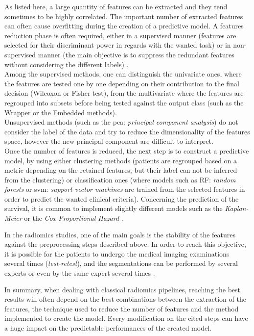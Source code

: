 As listed here, a large quantity of features can be extracted and they
tend sometimes to be highly correlated. The important number of extracted features can often cause
overfitting during the creation of a predictive model. A features reduction
phase is often required, either in a
supervised manner (features are selected for their discriminant power in
regards with the wanted task) or in non-supervised manner (the main
objective is to suppress the redundant features without considering the
different labels) \cite{Parekh2016}.\\
Among the supervised methods, one can distinguish the univariate ones,
where the features are tested one by one depending on their contribution
to the final decision (Wilcoxon or Fisher test), from the multivariate
where the features are regrouped into subsets before being tested
against the output class (such as the Wrapper or the Embedded methods).\\
Unsupervised methods (such as the \ac{pca}: \emph{principal component
analysis}) do not consider the label of the data and try 
to reduce the dimensionality of the features space, however the new principal component are difficult to interpret.\\
Once the number of features is reduced, the next step is to construct a
predictive model, by using either clustering methods (patients are
regrouped based on a metric depending on the retained features, but their label can not be inferred from the clustering) or
classification ones (where models such as RF: \emph{random forests} or
\ac{svm}: \emph{support vector machines} are trained from the selected
features in order to predict the wanted clinical criteria). Concerning
the prediction of the survival, it is common to implement slightly
different models such as the \emph{Kaplan-Meier} or the \emph{Cox
Proportional Hazard} \cite{Oikonomou2018}.

In the radiomics studies, one of the main goals is the stability of the
features against the preprocessing steps described above. In order to
reach this objective, it is possible for the patients to undergo the
medical imaging examinations several times (\emph{test-retest}), and the
segmentations can be performed by several experts or even by the same
expert several times \cite{Griethuysen2017}.

In summary, when dealing with classical radiomics pipelines, reaching
the best results will often depend on the best combinations between the
extraction of the features, the technique used to reduce the number of
features and the method implemented to create the model.
Every modification on the cited steps can have a huge impact on the
predictable performances of the created model.

